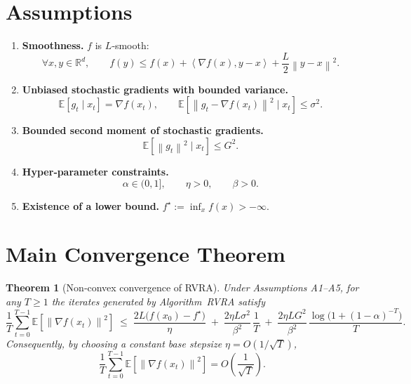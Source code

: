 \documentclass{article}
\newtheorem{theorem}{Theorem}
\newcommand{\E}{\mathbb{E}}
\newcommand{\norm}[1]{\left\|#1\right\|}
\newcommand{\ip}[2]{\left\langle #1,#2 \right\rangle}
\newcommand{\grad}{\nabla}
\begin{document}
\newpage
\section*{Assumptions}
\begin{enumerate}[label=\textbf{A\arabic*.}, leftmargin=*]
\item \textbf{Smoothness.} $f$ is $L$‑smooth:
\[
\forall x,y\in\mathbb{R}^d,\qquad 
f(y)\le f(x)+\ip{\grad f(x)}{y-x}+\frac{L}{2}\norm{y-x}^2 .
\tag{A1}
\]
\item \textbf{Unbiased stochastic gradients with bounded variance.}
\[
\E\!\left[g_t\mid x_t\right]=\grad f(x_t),\qquad
\E\!\left[\norm{g_t-\grad f(x_t)}^2\mid x_t\right]\le\sigma^2 .
\tag{A2}
\]
\item \textbf{Bounded second moment of stochastic gradients.}
\[
\E\!\left[\norm{g_t}^2\mid x_t\right]\le G^2 .
\tag{A3}
\]
\item \textbf{Hyper‑parameter constraints.}
\[
\alpha\in(0,1],\qquad \eta>0,\qquad \beta>0 .
\tag{A4}
\]
\item \textbf{Existence of a lower bound.} $f^\star:=\inf_{x}f(x)>-\infty$.
\end{enumerate}

\section*{Main Convergence Theorem}
\begin{theorem}[Non‑convex convergence of RVRA]
\label{thm:main}
Under Assumptions A1–A5, for any $T\ge 1$ the iterates generated by
Algorithm~RVRA satisfy
\[
\frac{1}{T}\sum_{t=0}^{T-1}\E\!\left[\norm{\grad f(x_t)}^2\right]
\;\le\;
\frac{2L\bigl(f(x_0)-f^\star\bigr)}{\eta}
\;+\;
\frac{2\eta L\sigma^2}{\beta^2}\,
\frac{1}{T}
\;+\;
\frac{2\eta L G^2}{\beta^2}\,
\frac{\log\!\bigl(1+(1-\alpha)^{-T}\bigr)}{T}.
\]
Consequently, by choosing a constant base stepsize $\eta=O(1/\sqrt{T})$,
\[
\frac{1}{T}\sum_{t=0}^{T-1}\E\!\left[\norm{\grad f(x_t)}^2\right]
= O\!\left(\frac{1}{\sqrt{T}}\right).
\]
\end{theorem}
\end{document}
